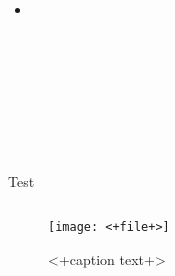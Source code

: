 
\begin{frame}\frametitle{}

\end{frame}

\begin{frame}\frametitle{}
  \begin{itemize}
    \item 
  \end{itemize}
\end{frame}

\begin{eqnarray*}
  
\end{eqnarray*}

\begin{eqnarray}
  
  \label{}
\end{eqnarray}

\begin{equation}
  
  \label{}
\end{equation}

\begin{equation*}
  
\end{equation*}

\[
  
\]

$$  $$

\begin{align}
  
  \label{}
\end{align}

\begin{align*}
  
\end{align*}

\begin{frame}
  \begin{block}{Test}
    
  \end{block}
\end{frame}

\begin{columns}[t]

\end{columns}

\begin{figure}[<+htpb+>]
  \centering
  \texttt{[image: <+file+>]}
  \caption{<+caption text+>}
  \label{fig:<+label+>}
\end{figure}

